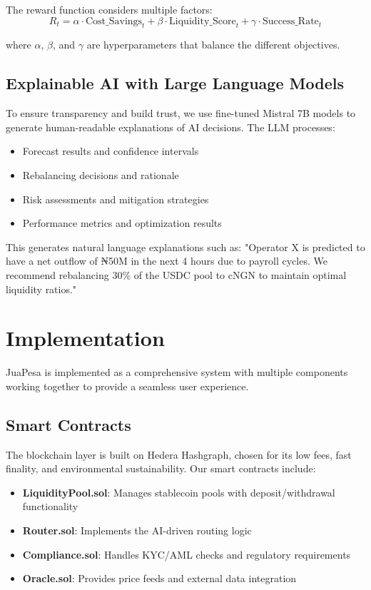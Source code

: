 \documentclass[11pt,a4paper]{article}
\begin{document}
The reward function considers multiple factors:
\begin{equation}
R_t = \alpha \cdot \text{Cost\_Savings}_t + \beta \cdot \text{Liquidity\_Score}_t + \gamma \cdot \text{Success\_Rate}_t
\end{equation}

where $\alpha$, $\beta$, and $\gamma$ are hyperparameters that balance the different objectives.

\subsection{Explainable AI with Large Language Models}

To ensure transparency and build trust, we use fine-tuned Mistral 7B models to generate human-readable explanations of AI decisions. The LLM processes:

\begin{itemize}
    \item Forecast results and confidence intervals
    \item Rebalancing decisions and rationale
    \item Risk assessments and mitigation strategies
    \item Performance metrics and optimization results
\end{itemize}

This generates natural language explanations such as: "Operator X is predicted to have a net outflow of ₦50M in the next 4 hours due to payroll cycles. We recommend rebalancing 30\% of the USDC pool to cNGN to maintain optimal liquidity ratios."

\section{Implementation}

JuaPesa is implemented as a comprehensive system with multiple components working together to provide a seamless user experience.

\subsection{Smart Contracts}

The blockchain layer is built on Hedera Hashgraph, chosen for its low fees, fast finality, and environmental sustainability. Our smart contracts include:

\begin{itemize}
    \item \textbf{LiquidityPool.sol}: Manages stablecoin pools with deposit/withdrawal functionality
    \item \textbf{Router.sol}: Implements the AI-driven routing logic
    \item \textbf{Compliance.sol}: Handles KYC/AML checks and regulatory requirements
    \item \textbf{Oracle.sol}: Provides price feeds and external data integration
\end{itemize}
\end{document}
